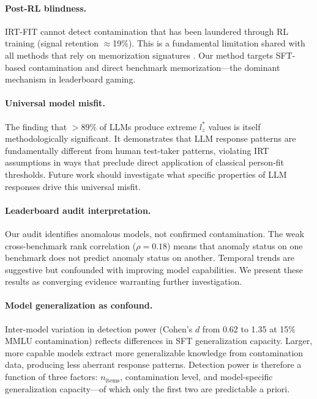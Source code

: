 \documentclass[11pt,a4paper]{article}
\begin{document}
\paragraph{Post-RL blindness.}
IRT-FIT cannot detect contamination that has been laundered through RL training (signal retention ${\approx}$19\%). This is a fundamental limitation shared with all methods that rely on memorization signatures \citep{wang2025contamination}. Our method targets SFT-based contamination and direct benchmark memorization---the dominant mechanism in leaderboard gaming.

\paragraph{Universal model misfit.}
The finding that $>$89\% of LLMs produce extreme $l_z^*$ values is itself methodologically significant. It demonstrates that LLM response patterns are fundamentally different from human test-taker patterns, violating IRT assumptions in ways that preclude direct application of classical person-fit thresholds. Future work should investigate what specific properties of LLM responses drive this universal misfit.

\paragraph{Leaderboard audit interpretation.}
Our audit identifies anomalous models, not confirmed contamination. The weak cross-benchmark rank correlation ($\rho=0.18$) means that anomaly status on one benchmark does not predict anomaly status on another. Temporal trends are suggestive but confounded with improving model capabilities. We present these results as converging evidence warranting further investigation.

\paragraph{Model generalization as confound.}
Inter-model variation in detection power (Cohen's $d$ from 0.62 to 1.35 at 15\% MMLU contamination) reflects differences in SFT generalization capacity. Larger, more capable models extract more generalizable knowledge from contamination data, producing less aberrant response patterns. Detection power is therefore a function of three factors: $n_{\text{items}}$, contamination level, and model-specific generalization capacity---of which only the first two are predictable a priori.
\end{document}
